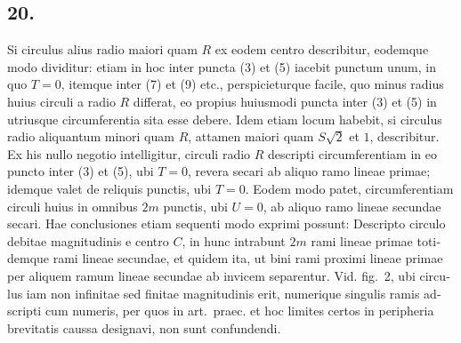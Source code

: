 \documentclass[12pt,a4paper]{article}
\begin{document}
\begin{otherlanguage}{latin}
\subsection*{20.}
Si circulus alius radio maiori quam $R$ ex eodem centro describitur, eodemque modo dividitur: etiam in hoc inter puncta (3) et (5) iacebit punctum unum, in quo $T=0$, itemque inter (7) et (9) etc., perspicieturque facile, quo minus radius huius circuli a radio $R$ differat, eo propius huiusmodi puncta inter (3) et (5) in utriusque circumferentia sita esse debere. Idem etiam locum habebit, si circulus radio aliquantum minori quam $R$, attamen maiori quam $S\sqrt{2}$ et $1$, describitur. Ex his nullo negotio intelligitur, circuli radio $R$ descripti circumferentiam in eo puncto inter (3) et (5), ubi $T=0$, revera secari ab aliquo ramo lineae primae; idemque valet de reliquis punctis, ubi $T=0$. Eodem modo patet, circumferentiam circuli huius in omnibus $2m$ punctis, ubi $U=0$, ab aliquo ramo lineae secundae secari. Hae conclusiones etiam sequenti modo exprimi possunt: Descripto circulo debitae magnitudinis e centro $C$, in hunc intrabunt $2m$ rami lineae primae totidemque rami lineae secundae, et quidem ita, ut bini rami proximi lineae primae per aliquem ramum lineae secundae ab invicem separentur. Vid. fig.~2, ubi circulus iam non infinitae sed finitae magnitudinis erit, numerique singulis ramis adscripti cum numeris, per quos in art.~praec. et hoc limites certos in peripheria brevitatis caussa designavi, non sunt confundendi.


\end{otherlanguage}
\end{document}
